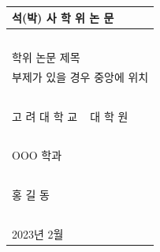 \documentclass[11pt]{report}
\theoremstyle{plain}
\theoremstyle{definition}
\theoremstyle{corollary}
\theoremstyle{definition}
\theoremstyle{plain}
\theoremstyle{definition}
\theoremstyle{plain}
\begin{document}
\onehalfspacing
\renewcommand{\arraystretch}{1.5}

\newpage
\noindent
\begin{tabularx}{\textwidth}{| >{\centering\arraybackslash}X |}
\arrayrulecolor{gray}
\hline
\Large 석(박) 사 학 위 논 문 \\\hline
~\small\color{gray}{3cm spacing}\vspace{70pt}\\\hline %
\huge 학위 논문 제목\\
\Large 부제가 있을 경우 중앙에 위치\\
~\small\color{gray}{여백 조정 가능}\vspace{14pt}\\\hline 
\LARGE 고 려 대 학 교 ~ 대 학 원\\\hline %
~\small\color{gray}{0.5cm 여백}\\\hline
\Large OOO 학과 \\\hline
~\small\color{gray}{0.5cm 여백}\\\hline
\Large 홍 길 동 \\\hline
~\small\color{gray}{3cm spacing}\vspace{70pt}\\\hline %
\large 2023년 2월 \\\hline
\end{tabularx}

\newpage
~
%
%
%
%
%
\end{document}
